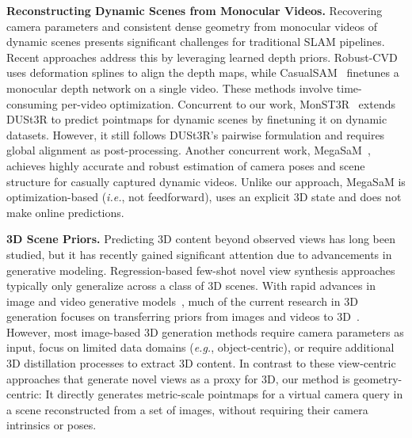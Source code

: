 \vspace{0.5em}\noindent\textbf{Reconstructing Dynamic Scenes from Monocular Videos.}
Recovering camera parameters and consistent dense geometry from monocular videos of dynamic scenes presents significant challenges for traditional SLAM pipelines. Recent approaches address this by leveraging learned depth priors.
Robust-CVD~\cite{robustcvd} uses deformation splines to align the depth maps, while 
CasualSAM~\cite{casualsam} finetunes a monocular depth network on a single video. These methods involve time-consuming per-video optimization.
Concurrent to our work, MonST3R~\cite{zhang2024monst3r} extends DUSt3R to predict pointmaps for dynamic scenes by finetuning it on dynamic datasets. However, it still follows DUSt3R's pairwise formulation and requires global alignment as post-processing. Another concurrent work, MegaSaM~\cite{li2024megasam}, achieves highly accurate and robust estimation of camera poses and scene structure for casually captured dynamic videos. Unlike our approach, MegaSaM is optimization-based (\textit{i.e.}, not feedforward), uses an explicit 3D state and does not make online predictions. 



\vspace{0.5em}\noindent\textbf{3D Scene Priors.} 
Predicting 3D content beyond observed views has long been studied, but it has recently gained significant attention due to advancements in generative modeling. Regression-based few-shot novel view synthesis approaches~\cite{sitzmann2019scene,yu2021pixelnerf,sitzmann2021light,lai2021video} typically only generalize across a class of 3D scenes. With rapid advances in image and video generative models~\cite{rombach2022high,ramesh2021zero,saharia2022photorealistic}, much of the current research in 3D generation focuses on transferring priors from images and videos to 3D~\cite{liu2023zero1to3, melaskyriazi2023realfusion, wu2024reconfusion, poole2022dreamfusion}.
However, most image-based 3D generation methods require camera parameters as input, focus on limited data domains (\textit{e.g.}, object-centric), or require additional 3D distillation processes to extract 3D content. In contrast to these view-centric approaches that generate novel views as a proxy for 3D, our method is geometry-centric:
It directly generates metric-scale pointmaps for a virtual camera query in a scene reconstructed from a set of images, without requiring their camera intrinsics or poses.



  






